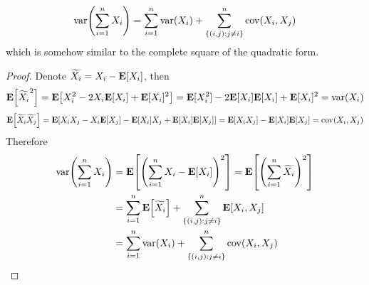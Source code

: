 \begin{theorem}
    \begin{equation}
        \mathrm{var}\qty(\sum_{i=1}^{n} X_i) = \sum_{i=1}^{n} \mathrm{var}(X_i) + \sum_{\{(i,j): j \neq i\}}^{n} \mathrm{cov}(X_i, X_j)
    \end{equation}
    which is somehow similar to the complete square of the quadratic form.
\end{theorem}
\begin{proof}
    Denote $\widetilde{X_i} = X_i - \mathbf{E}[X_i]$, then
    \begin{equation}
        \mathbf{E}\qty[\widetilde{X_i}^2] = \mathbf{E}\qty[X_i^2 - 2X_i\mathbf{E}[X_i] + \mathbf{E}[X_i]^2] = \mathbf{E}[X_i^2] - 2\mathbf{E}[X_i]\mathbf{E}[X_i] + \mathbf{E}[X_i]^2 = \mathrm{var}(X_i)
    \end{equation}
    \begin{equation}
        \mathbf{E}\qty[\widetilde{X_i}\widetilde{X_j}] = \mathbf{E}\qty[X_i X_j - X_i \mathbf{E}[X_j] - \mathbf{E}[X_i] X_j + \mathbf{E}[X_i] \mathbf{E}[X_j]] = \mathbf{E}[X_i X_j] - \mathbf{E}[X_i]\mathbf{E}[X_j] = \mathrm{cov}(X_i, X_j)
    \end{equation} 
    Therefore
    \begin{equation}
    \begin{aligned}
        \mathrm{var}\qty(\sum_{i=1}^{n} X_i) &= \mathbf{E}\qty[\qty(\sum_{i=1}^{n}X_i - \mathbf{E}[X_i])^2] = \mathbf{E}\qty[\qty(\sum_{i=1}^{n} \widetilde{X_i})^2] \\ 
        &= \sum_{i=1}^{n}\mathbf{E}\qty[\widetilde{X_i}] + \sum_{\{(i,j): j \neq i\}}^{n}\mathbf{E}\qty[X_i, X_j] \\ 
        &= \sum_{i=1}^{n} \mathrm{var}(X_i) + \sum_{\{(i,j): j \neq i\}}^{n} \mathrm{cov}(X_i, X_j)
    \end{aligned}
    \end{equation}
\end{proof}

